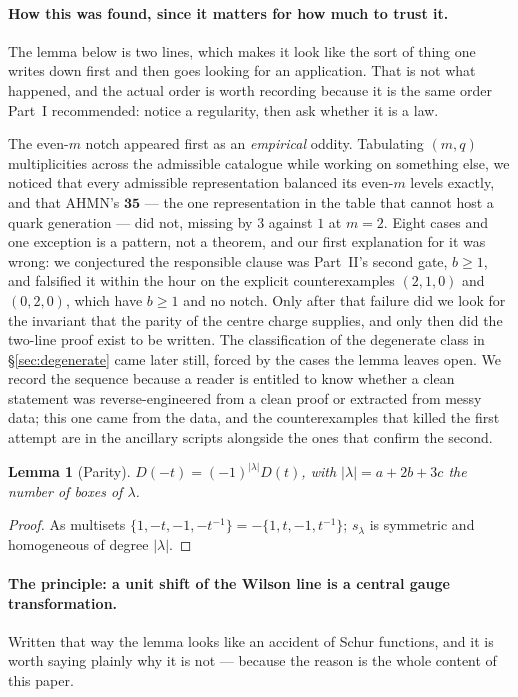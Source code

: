 \documentclass[11pt,a4paper]{article}
\newtheorem{lemma}{Lemma}
\newcommand{\lam}{|\lambda|}
\begin{document}
\paragraph{How this was found, since it matters for how much to trust it.} The lemma below
is two lines, which makes it look like the sort of thing one writes down first and then goes
looking for an application. That is not what happened, and the actual order is worth
recording because it is the same order Part~I recommended: notice a regularity, then ask
whether it is a law.

The even-$m$ notch appeared first as an \emph{empirical} oddity. Tabulating $(m,q)$
multiplicities across the admissible catalogue while working on something else, we noticed
that every admissible representation balanced its even-$m$ levels exactly, and that AHMN's
$\mathbf{35}$ --- the one representation in the table that cannot host a quark generation ---
did not, missing by $3$ against $1$ at $m=2$. Eight cases and one exception is a pattern, not
a theorem, and our first explanation for it was wrong: we conjectured the responsible clause
was Part~II's second gate, $b\ge1$, and falsified it within the hour on the explicit
counterexamples $(2,1,0)$ and $(0,2,0)$, which have $b\ge1$ and no notch. Only after that
failure did we look for the invariant that the parity of the centre charge supplies, and only
then did the two-line proof exist to be written. The classification of the degenerate class
in \S\ref{sec:degenerate} came later still, forced by the cases the lemma leaves open. We
record the sequence because a reader is entitled to know whether a clean statement was
reverse-engineered from a clean proof or extracted from messy data; this one came from the
data, and the counterexamples that killed the first attempt are in the ancillary scripts
alongside the ones that confirm the second.

\begin{lemma}[Parity]\label{lem:parity}
$D(-t)=(-1)^{\lam}D(t)$, with $\lam=a+2b+3c$ the number of boxes of $\lambda$.
\end{lemma}
\begin{proof}
As multisets $\{1,-t,-1,-t^{-1}\}=-\{1,t,-1,t^{-1}\}$; $s_\lambda$ is symmetric and
homogeneous of degree $\lam$.
\end{proof}

\paragraph{The principle: a unit shift of the Wilson line is a central gauge transformation.}
Written that way the lemma looks like an accident of Schur functions, and it is worth saying
plainly why it is not --- because the reason is the whole content of this paper.
\end{document}

